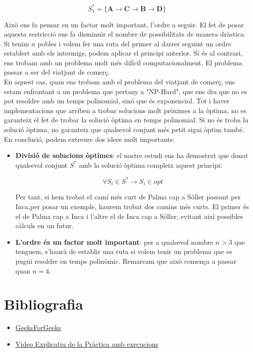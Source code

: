 \documentclass[conference]{IEEEtran}
\begin{document}
    $$S_{1}^*=\{\textbf{A}\rightarrow \textbf{C}\rightarrow \textbf{B}\rightarrow \textbf{D}\}$$

    Això ens fa pensar en un factor molt important, l'ordre a seguir. El fet de posar aquesta restricció ens fa disminuir el nombre de possibilitats de manera dràstica. Si tenim $n$ pobles i volem fer una ruta del primer al darrer seguint un ordre establert amb els intermigs, podem aplicar el principi anterior. Si és al contrari, ens trobam amb un problema molt més difícil computacionalment. El problema passar a ser del viatjant de comerç.\\

    En aquest cas, quan ens trobam amb el problema del viatjant de comerç, ens estam enfrontant a un problema que pertany a "NP-Hard", que ens diu que no es pot resoldre amb un temps polinomial, sinó que és exponencial. Tot i haver implementacions que arriben a trobar solucions molt pròximes a la òptima, no es garanteix el fet de trobar la solució òptima en temps polinomial. Si no és troba la solució òptima, no garanteix que qualsevol conjunt més petit sigui òptim també.\\

    En conclusió, podem extreure dos idees molt importants:\\


    \begin{itemize}
        \item \textbf{Divisió de solucions òptimes}: el nostre estudi ens ha demostrat que donat qualsevol conjunt $S^*$ amb la solució òptima compleix aquest principi:

        $$\forall S_{i} \in S^*\rightarrow S_{i}\in opt$$

        Per tant, si hem trobat el camí més curt de Palma cap a Sóller passant per Inca,per posar un exemple, haurem trobat dos camins més curts. El primer és el de Palma cap a Inca i l'altre el de Inca cap a Sóller, evitant així possibles càlculs en un futur.\\
        \item \textbf{L'ordre és un factor molt important}: per a qualsevol nombre $n>3$ que tenguem, s'haurà de establir una ruta si volem tenir un problema que es pugui resoldre en temps polinòmic. Remarcam que això comença a passar quan $n=4$.
        
    \end{itemize}




\section{Bibliografia}
\begin{itemize}
    \item \href{https://www.geeksforgeeks.org/dijkstras-shortest-path-algorithm-greedy-algo-7/}{GeeksForGeeks}
    \item \href{https://www.youtube.com/watch?v=quH8JShX33o}{Video Explicatiu de la Pràctica amb execucions}
\end{itemize}
    
\end{document}
